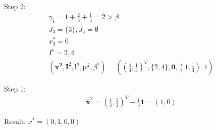 \documentclass[12pt]{article}
\begin{document}
Step 2:
\begin{align*}
 \gamma_1=1+\frac{2}{3}+\frac{1}{3} =2>\beta \\
 J_3=\{3\}, J_4=\emptyset \\
x^*_3=0\\
I^{1}={2,4}\\
( \bm{\bar x^2},\bm I^2, \bm l^2, \bm \mu^2, \beta^2 )
= ( (\frac{4}{3},\frac{1}{3})^T,\{2,4\}, \bm 0, (1,\frac{1}{3}), 1 )
\end{align*}

Step 1:
\begin{align*}
\hat{\bm x}^2= (\frac{4}{3},\frac{1}{3})^T-\frac{1}{3}\bm 1
=(1,0)
\end{align*}

Result:
$x^*=(0,1,0,0)$
\end{document}
